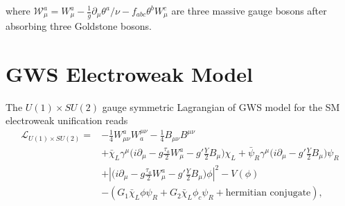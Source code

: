 \noindent where $\mathcal{W}^a_\mu = W^a_\mu - \frac{1}{g} \partial_\mu \theta^a / \nu - f_{abc}\theta^b W^c_\mu$ are three massive gauge bosons after absorbing three Goldstone bosons.



\section{GWS Electroweak Model}
\label{sec:relatedWorks:qft:gws}
The $U(1) \times SU(2)$ gauge symmetric Lagrangian of GWS model for the SM electroweak unification reads 
\begin{equation}
\begin{split}
    \mathcal{L}_{U(1)\times SU(2)} =&  - \frac{1}{4}W^a_{\mu\nu}W^{\mu\nu}_a - \frac{1}{4}B_{\mu\nu}B^{\mu\nu} \\
    & + \bar{\chi}_L \gamma^\mu \big( i \partial_\mu -g \frac{\tau_a}{2} W^a_\mu -g'\frac{Y}{2} B_\mu \big) \chi_L 
    + \bar{\psi}_R \gamma^\mu \big( i \partial_\mu -g'\frac{Y}{2} B_\mu \big) \psi_R \\
    & + \left\lvert  \big( i \partial_\mu -g \frac{\tau_a}{2} W^a_\mu -g'\frac{Y}{2} B_\mu \big)\phi \right\rvert ^2 - V(\phi) \\
    & -(G_1 \bar{\chi}_L \phi \psi_R + G_2 \bar{\chi}_L \phi_c \psi_R + \text{hermitian conjugate}) ,
\end{split}
\label{eqn:relatedWorks:qft:gws:lagragian}
\end{equation}

